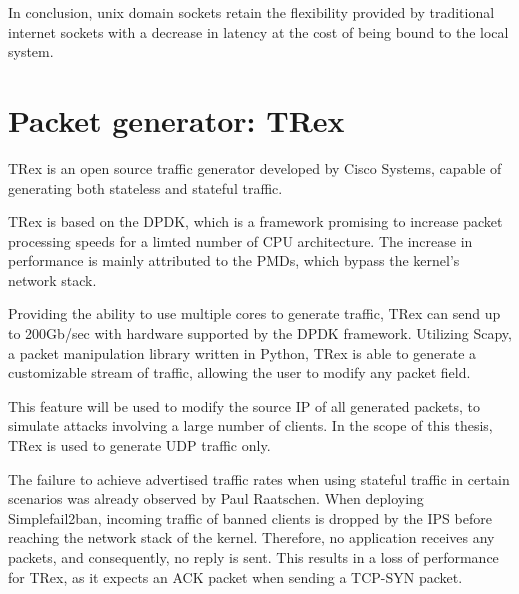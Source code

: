In conclusion, unix domain sockets retain the flexibility provided by traditional internet sockets with a decrease in latency at the cost of being bound to the local system.

\section{Packet generator: TRex}
TRex is an open source traffic generator developed by Cisco Systems, capable of generating both stateless and stateful traffic\cite{trex}.

TRex is based on the \ac{DPDK}, which is a framework promising to increase packet processing speeds for a limted number of \ac{CPU} architecture.
The increase in performance is mainly attributed to the \ac{PMDs}, which bypass the kernel's network stack.\cite{dpdk}

Providing the ability to use multiple cores to generate traffic, TRex can send up to 200Gb/sec with hardware supported by the \ac{DPDK} framework.
Utilizing Scapy, a packet manipulation library written in Python\cite{scapy}, TRex is able to generate a customizable stream of traffic, allowing the user to modify any packet field.\cite{trex}

This feature will be used to modify the source \ac{IP} of all generated packets, to simulate attacks involving a large number of clients.
In the scope of this thesis, TRex is used to generate \ac{UDP} traffic only.

The failure to achieve advertised traffic rates when using stateful traffic in certain scenarios was already observed by Paul Raatschen.
When deploying Simplefail2ban, incoming traffic of banned clients is dropped by the \ac{IPS} before reaching the network stack of the kernel.
Therefore, no application receives any packets, and consequently, no reply is sent.
This results in a loss of performance for TRex, as it expects an \ac{ACK} packet when sending a \ac{TCP-SYN} packet.\cite{raatschen:ipc}
